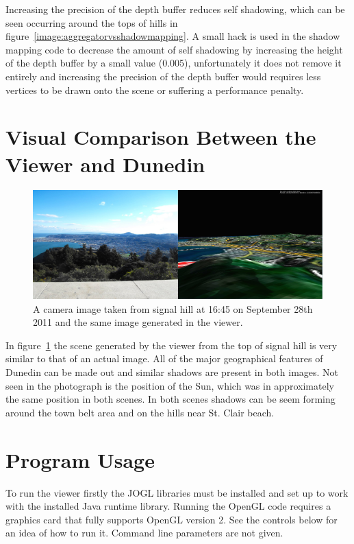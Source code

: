 \documentclass[12pt]{report}
\begin{document}
Increasing the precision of the depth buffer reduces self shadowing, which can be seen occurring around the tops of hills in figure~\ref{image:aggregatorvsshadowmapping}. A small hack is used in the shadow mapping code to decrease the amount of self shadowing by increasing the height of the depth buffer by a small value (0.005), unfortunately it does not remove it entirely and increasing the precision of the depth buffer would requires less vertices to be drawn onto the scene or suffering a performance penalty.

\section{Visual Comparison Between the Viewer and Dunedin}
\begin{figure}[h]
\centering
\includegraphics[width=\textwidth]{realvsviewer.jpg}
\caption{A camera image taken from signal hill at 16:45 on September 28th 2011 and the same image generated in the viewer.}
\label{image:realvsviewer}
\end{figure}

In figure~\ref{image:realvsviewer} the scene generated by the viewer from the top of signal hill is very similar to that of an actual image. All of the major geographical features of Dunedin can be made out and similar shadows are present in both images. Not seen in the photograph is the position of the Sun, which was in approximately the same position in both scenes. In both scenes shadows can be seem forming around the town belt area and on the hills near St. Clair beach.

\section{Program Usage}

To run the viewer firstly the JOGL libraries must be installed and set up to work with the installed Java runtime library. Running the OpenGL code requires a graphics card that fully supports OpenGL version 2. See the controls below for an idea of how to run it. Command line parameters are not given.
\end{document}
